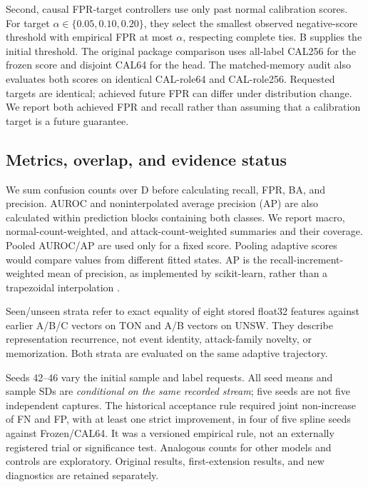Second, causal FPR-target controllers use only past normal calibration scores. For target $\alpha\in\{0.05,0.10,0.20\}$, they select the smallest observed negative-score threshold with empirical FPR at most $\alpha$, respecting complete ties. B supplies the initial threshold. The original package comparison uses all-label CAL256 for the frozen score and disjoint CAL64 for the head. The matched-memory audit also evaluates both scores on identical CAL-role64 and CAL-role256. Requested targets are identical; achieved future FPR can differ under distribution change. We report both achieved FPR and recall rather than assuming that a calibration target is a future guarantee.

\subsection{Metrics, overlap, and evidence status}
We sum confusion counts over D before calculating recall, FPR, BA, and precision. AUROC and noninterpolated average precision (AP) are also calculated within prediction blocks containing both classes. We report macro, normal-count-weighted, and attack-count-weighted summaries and their coverage. Pooled AUROC/AP are used only for a fixed score. Pooling adaptive scores would compare values from different fitted states. AP is the recall-increment-weighted mean of precision, as implemented by scikit-learn, rather than a trapezoidal interpolation \citep{pedregosa2011,sklearnap}.

Seen/unseen strata refer to exact equality of eight stored float32 features against earlier A/B/C vectors on TON and A/B vectors on UNSW. They describe representation recurrence, not event identity, attack-family novelty, or memorization. Both strata are evaluated on the same adaptive trajectory.

Seeds 42--46 vary the initial sample and label requests. All seed means and sample SDs are \emph{conditional on the same recorded stream}; five seeds are not five independent captures. The historical acceptance rule required joint non-increase of FN and FP, with at least one strict improvement, in four of five spline seeds against Frozen/CAL64. It was a versioned empirical rule, not an externally registered trial or significance test. Analogous counts for other models and controls are exploratory. Original results, first-extension results, and new diagnostics are retained separately.

